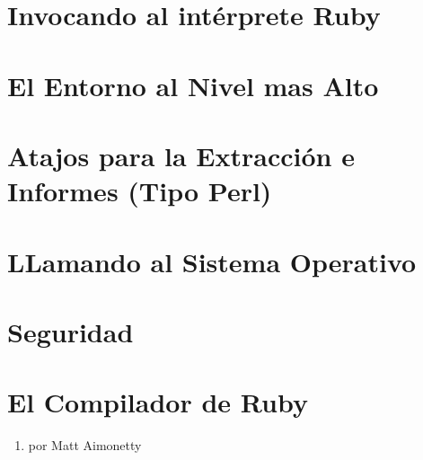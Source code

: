 \section{Invocando al intérprete Ruby}

\section{El Entorno al Nivel mas Alto}

\section{Atajos para la Extracción e Informes (Tipo Perl)}

\section{LLamando al Sistema Operativo}

\section{Seguridad}

\section{El Compilador de Ruby}


\begin{enumerate}
\item 
{} por Matt Aimonetty
\end{enumerate}
